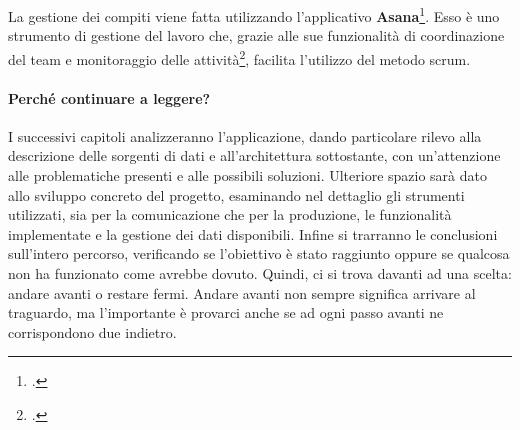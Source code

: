 \documentclass[./main.tex]{subfiles}
\begin{document}
La gestione dei compiti viene fatta utilizzando l'applicativo \textbf{Asana}\footcite[\url{https://asana.com/it}]{website-asana}. Esso è uno strumento di gestione del lavoro che, grazie alle sue funzionalità di coordinazione del team e monitoraggio delle attività\footcite[\url{https://help.asana.com/hc/it/articles/14250783001627-Come-iniziare-a-usare-Asana\#h\_01HEQV7CDGXHBY06W9PQAXB8RK}]{website-asana}, facilita l'utilizzo del metodo scrum.\par

\paragraph{Perché continuare a leggere?} I successivi capitoli analizzeranno l'applicazione, dando particolare rilevo alla descrizione delle sorgenti di dati e all'architettura sottostante, con un'attenzione alle problematiche presenti e alle possibili soluzioni. Ulteriore spazio sarà dato allo sviluppo concreto del progetto, esaminando nel dettaglio gli strumenti utilizzati, sia per la comunicazione che per la produzione, le funzionalità implementate e la gestione dei dati disponibili. Infine si trarranno le conclusioni sull'intero percorso, verificando se l'obiettivo è stato raggiunto oppure se qualcosa non ha funzionato come avrebbe dovuto.
Quindi, ci si trova davanti ad una scelta: andare avanti o restare fermi. Andare avanti non sempre significa arrivare al traguardo, ma l'importante è provarci anche se ad ogni passo avanti ne corrispondono due indietro.\par
\end{document}
